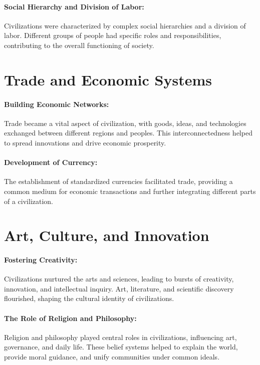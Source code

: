 \documentclass[a4paper,12pt]{book}
\begin{document}
\paragraph{Social Hierarchy and Division of Labor:}
Civilizations were characterized by complex social hierarchies and a division of labor. Different groups of people had specific roles and responsibilities, contributing to the overall functioning of society.

\section*{Trade and Economic Systems}

\paragraph{Building Economic Networks:}
Trade became a vital aspect of civilization, with goods, ideas, and technologies exchanged between different regions and peoples. This interconnectedness helped to spread innovations and drive economic prosperity.

\paragraph{Development of Currency:}
The establishment of standardized currencies facilitated trade, providing a common medium for economic transactions and further integrating different parts of a civilization.

\section*{Art, Culture, and Innovation}

\paragraph{Fostering Creativity:}
Civilizations nurtured the arts and sciences, leading to bursts of creativity, innovation, and intellectual inquiry. Art, literature, and scientific discovery flourished, shaping the cultural identity of civilizations.

\paragraph{The Role of Religion and Philosophy:}
Religion and philosophy played central roles in civilizations, influencing art, governance, and daily life. These belief systems helped to explain the world, provide moral guidance, and unify communities under common ideals.
\end{document}
